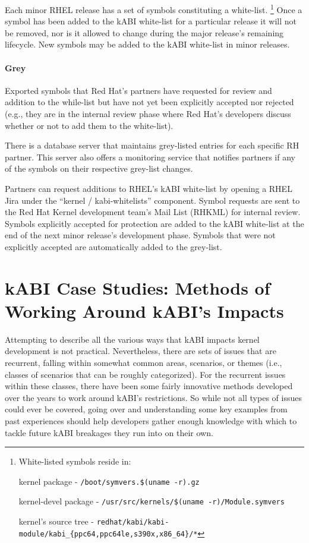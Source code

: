 \documentclass[10pt,oneside,english]{book}
\begin{document}
Each minor RHEL release has a set of symbols constituting a white-list.
\footnote{White-listed symbols reside in:

kernel package - \texttt{/boot/symvers.\$(uname -r).gz}

kernel-devel package - \texttt{/usr/src/kernels/\$(uname -r)/Module.symvers}

kernel's source tree - \texttt{redhat/kabi/kabi-module/kabi\_\{ppc64,ppc64le,s390x,x86\_64\}/{*}}} Once a symbol has been added to the kABI white-list for a particular
release it will not be removed, nor is it allowed to change during
the major release's remaining lifecycle. New symbols may be added
to the kABI white-list in minor releases.

\subsubsection{Grey}

Exported symbols that Red Hat's partners have requested for review
and addition to the while-list but have not yet been explicitly accepted
nor rejected (e.g., they are in the internal review phase where Red
Hat's developers discuss whether or not to add them to the white-list).

There is a database server that maintains grey-listed entries for
each specific RH partner. This server also offers a monitoring service
that notifies partners if any of the symbols on their respective grey-list
changes.

Partners can request additions to RHEL's kABI white-list by opening
a RHEL Jira under the ``kernel / kabi-whitelists'' component.
Symbol requests are sent to the Red Hat Kernel development
team's Mail List (RHKML) for internal review. Symbols explicitly accepted
for protection are added to the kABI white-list at the end of the
next minor release's development phase. Symbols that were not explicitly
accepted are automatically added to the grey-list.

\chapter{kABI Case Studies: Methods of Working Around kABI's Impacts \label{chap:kABI-Case-Studies}}

Attempting to describe all the various ways that kABI impacts kernel
development is not practical. Nevertheless, there are sets of issues
that are recurrent, falling within somewhat common areas, scenarios,
or themes (i.e., classes of scenarios that can be roughly categorized).
For the recurrent issues within these classes, there have been some
fairly innovative methods developed over the years to work around
kABI's restrictions. So while not all types of issues could ever be
covered, going over and understanding some key examples from past
experiences should help developers gather enough knowledge with which
to tackle future kABI breakages they run into on their own.
\end{document}
